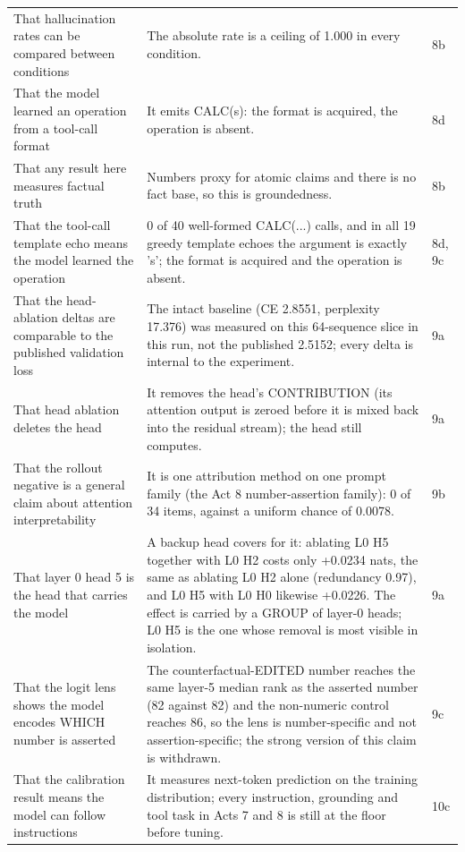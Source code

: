 \begin{longtable}{L{7.6cm}L{5.4cm}L{1.6cm}}
That hallucination rates can be compared between conditions & The absolute rate is a ceiling of 1.000 in every condition. & 8b \\
That the model learned an operation from a tool-call format & It emits CALC(s): the format is acquired, the operation is absent. & 8d \\
That any result here measures factual truth & Numbers proxy for atomic claims and there is no fact base, so this is groundedness. & 8b \\
That the tool-call template echo means the model learned the operation & 0 of 40 well-formed CALC(...) calls, and in all 19 greedy template echoes the argument is exactly 's'; the format is acquired and the operation is absent. & 8d, 9c \\
That the head-ablation deltas are comparable to the published validation loss & The intact baseline (CE 2.8551, perplexity 17.376) was measured on this 64-sequence slice in this run, not the published 2.5152; every delta is internal to the experiment. & 9a \\
That head ablation deletes the head & It removes the head's CONTRIBUTION (its attention output is zeroed before it is mixed back into the residual stream); the head still computes. & 9a \\
That the rollout negative is a general claim about attention interpretability & It is one attribution method on one prompt family (the Act 8 number-assertion family): 0 of 34 items, against a uniform chance of 0.0078. & 9b \\
That layer 0 head 5 is the head that carries the model & A backup head covers for it: ablating L0 H5 together with L0 H2 costs only +0.0234 nats, the same as ablating L0 H2 alone (redundancy 0.97), and L0 H5 with L0 H0 likewise +0.0226. The effect is carried by a GROUP of layer-0 heads; L0 H5 is the one whose removal is most visible in isolation. & 9a \\
That the logit lens shows the model encodes WHICH number is asserted & The counterfactual-EDITED number reaches the same layer-5 median rank as the asserted number (82 against 82) and the non-numeric control reaches 86, so the lens is number-specific and not assertion-specific; the strong version of this claim is withdrawn. & 9c \\
That the calibration result means the model can follow instructions & It measures next-token prediction on the training distribution; every instruction, grounding and tool task in Acts 7 and 8 is still at the floor before tuning. & 10c \\

\end{longtable}
